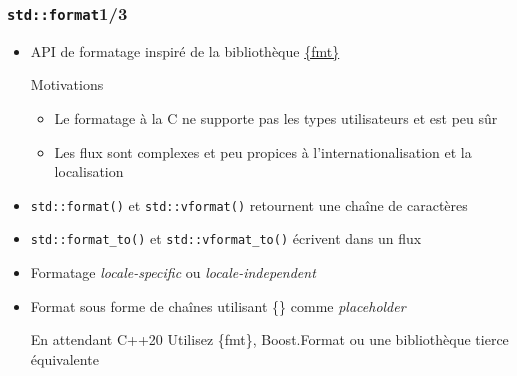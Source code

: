 \documentclass[C++.tex]{subfiles}
\begin{document}
\begin{frame}[fragile]
	\frametitle{\lstinline|std::format|\titlehfill{}1/3}
	\begin{itemize}
		\item API de formatage inspiré de la bibliothèque  \href{https://github.com/fmtlib/fmt}{\{fmt\}}
		
		\begin{block}{Motivations}
			\begin{itemize}
				\item Le formatage \og à la C\fg{} ne supporte pas les types utilisateurs et est peu sûr


				\item Les flux sont complexes et peu propices à l'internationalisation et la localisation

			\end{itemize}
		\end{block}
	
		\item \lstinline|std::format()| et \lstinline|std::vformat()| retournent une chaîne de caractères
		\item \lstinline|std::format_to()| et \lstinline|std::vformat_to()| écrivent dans un flux
		\item Formatage \textit{locale-specific} ou \textit{locale-independent}


		\item Format sous forme de chaînes utilisant \{\} comme \textit{placeholder}

		\begin{block}{En attendant C++20}
			Utilisez \{fmt\}, Boost.Format ou une bibliothèque tierce équivalente
		\end{block}
	\end{itemize}
\end{frame}
\end{document}
